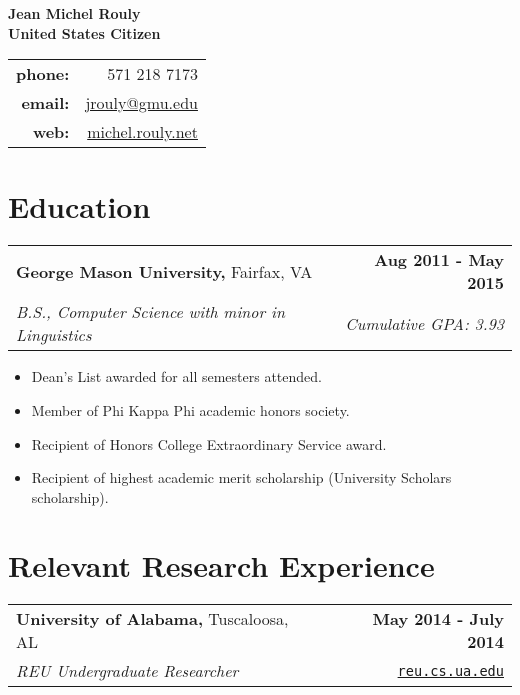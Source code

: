 \documentclass[letterpaper]{article}
\newenvironment{details}
{\begin{itemize}}
{\end{itemize}}
\begin{document}
  \setcounter{secnumdepth}{0}

  \begin{multicols}{2}
    \huge\noindent\textbf{Jean Michel Rouly}\\
    \normalsize\noindent\textbf{United States Citizen}

    \columnbreak

    \raggedleft
    \begin{tabular}{rr}
    \textbf{phone:}  &  571 218 7173\\
    \textbf{email:}  &  \href{mailto:jrouly@gmu.edu}{jrouly@gmu.edu}\\
    \textbf{web:}    &  \href{michel.rouly.net}{michel.rouly.net}
    \end{tabular}
  \end{multicols}


  \section{Education}

  \noindent
  \begin{tabularx}{\textwidth}{@{}X r@{}}
    \textbf{George Mason University,} Fairfax, VA & \textbf{Aug 2011 - May 2015} \\
    \emph{B.S., Computer Science with minor in Linguistics} & \emph{Cumulative GPA: 3.93}
  \end{tabularx}

  \begin{details}
  \item Dean's List awarded for all semesters attended.
  \item Member of Phi Kappa Phi academic honors society.
  \item Recipient of Honors College Extraordinary Service award.
  \item Recipient of highest academic merit scholarship (University Scholars scholarship).
  \end{details}


  \section{Relevant Research Experience}

  \noindent
  \begin{tabularx}{\textwidth}{@{}X r@{}}
    \textbf{University of Alabama,} Tuscaloosa, AL & \textbf{May 2014 - July 2014} \\
    \emph{REU Undergraduate Researcher} & \texttt{\href{reu.cs.ua.edu}{reu.cs.ua.edu}}
  \end{tabularx}
\end{document}
